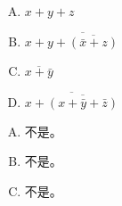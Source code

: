 {{        %
        \begin{practices}
            \begin{enumerate}[A.]
                \item $x + y + z$
                \item $x + \overline{y + \overline{(\bar{x} + z)}}$
                \item $\overline{x + \bar{y}}$
                \item $\overline{x + \overline{(x + \bar{y} + \bar{z})}}$
            \end{enumerate}
        \end{practices}

        \begin{practices}

        \end{practices}

        \begin{practices}

        \end{practices}

        \begin{practices}

        \end{practices}

        \begin{practices}

        \end{practices}

        \begin{practices}

        \end{practices}

        \begin{practices}

        \end{practices}

        \begin{practices}
            \begin{enumerate}[A.]
                \item 不是。
                \item 不是。
                \item 不是。
            \end{enumerate}
        \end{practices}
    }
}

